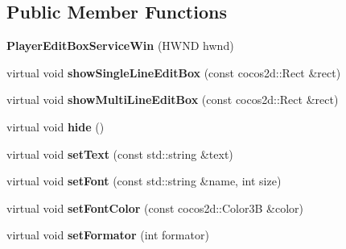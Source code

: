 \subsection*{Public Member Functions}
\begin{DoxyCompactItemize}
\item 
\mbox{\label{classPlayerEditBoxServiceWin_a46bc7a148a15c0f158b221137e81d586}} 
{\bfseries Player\+Edit\+Box\+Service\+Win} (H\+W\+ND hwnd)
\item 
\mbox{\label{classPlayerEditBoxServiceWin_a62de505dca3cec4f5d840608817aa31b}} 
virtual void {\bfseries show\+Single\+Line\+Edit\+Box} (const cocos2d\+::\+Rect \&rect)
\item 
\mbox{\label{classPlayerEditBoxServiceWin_a11f6dcb9970bf2bfdc3fb8f7d94112c3}} 
virtual void {\bfseries show\+Multi\+Line\+Edit\+Box} (const cocos2d\+::\+Rect \&rect)
\item 
\mbox{\label{classPlayerEditBoxServiceWin_a3e1cff6107ad7ad01fb992f321faa9f1}} 
virtual void {\bfseries hide} ()
\item 
\mbox{\label{classPlayerEditBoxServiceWin_a6f2c6f220f98a709393e31a735f0f81f}} 
virtual void {\bfseries set\+Text} (const std\+::string \&text)
\item 
\mbox{\label{classPlayerEditBoxServiceWin_a02e29a41f98c2b9fc3343fb91e6f3f00}} 
virtual void {\bfseries set\+Font} (const std\+::string \&name, int size)
\item 
\mbox{\label{classPlayerEditBoxServiceWin_aa073eeff26a2f08ce85cefa7adff753a}} 
virtual void {\bfseries set\+Font\+Color} (const cocos2d\+::\+Color3B \&color)
\item 
\mbox{\label{classPlayerEditBoxServiceWin_a6a94dae8cd414eaf1321eec697f610e6}} 
virtual void {\bfseries set\+Formator} (int formator)
\item 
\mbox{\label{classPlayerEditBoxServiceWin_ae26d881088a575ba1f7887d04b002fe1}} 

\end{DoxyCompactItemize}
